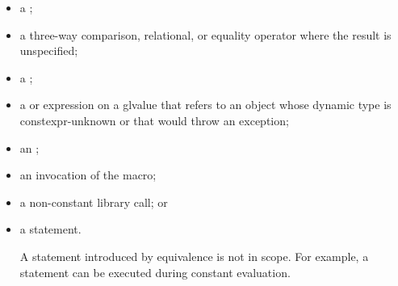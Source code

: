 \begin{itemize}
\item
a ;

\item
a three-way comparison,
relational, or equality
operator where the result is unspecified;

\item
a ;

\item
a  or
 expression
on a glvalue that refers to an object
whose dynamic type is constexpr-unknown or
that would throw an exception;

\item
an ;

\item
an invocation of the  macro;

\item
a non-constant library call;
or

\item
a  statement.
\begin{note}
A  statement introduced by equivalence
is not in scope.
For example, a  statement
can be executed during constant evaluation.
\end{note}
\end{itemize}

